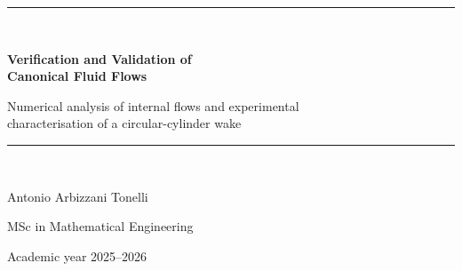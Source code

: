 \documentclass[11pt,a4paper]{article}
\begin{document}
\begin{titlepage}
  \centering
  \vspace*{22mm}
  {\color{reportblue}\rule{\linewidth}{1.4pt}}\\[9mm]
  {\LARGE\bfseries Verification and Validation of\\[2mm] Canonical Fluid Flows\par}
  \vspace{5mm}
  {\large Numerical analysis of internal flows and experimental\\
  characterisation of a circular-cylinder wake\par}
  \vspace{9mm}
  {\color{reportblue}\rule{\linewidth}{0.7pt}}\\[20mm]
  {\large Antonio Arbizzani Tonelli\par}
  \vspace{3mm}
  {\normalsize MSc in Mathematical Engineering\par}
  \vfill
  {\normalsize Academic year 2025--2026\par}
  \vspace{18mm}
\end{titlepage}

\begin{abstract}
This work presents a numerical and experimental investigation of two classes of canonical fluid-flow problems. The numerical part concerns laminar and turbulent flow in circular pipes. Mesh sensitivity, hydrodynamic development, the fully developed velocity profile, pressure losses, wall scaling, and turbulence-model performance are assessed from PHOENICS simulations. The experimental part concerns the wake and fluid forces generated by a circular cylinder in a free-surface channel. The measurement chain is first calibrated and checked for stability; particle-shadow velocimetry then resolves the mean wake and its dominant unsteadiness, while force measurements provide the mean drag and lift coefficients and an independent estimate of the shedding frequency.

The laminar calculation reproduces the Poiseuille profile with a relative $L_\infty$ error of $3.18\%$ and the analytical pressure gradient within $1.24\%$. At $Re_b=75{,}000$, the standard $k$--$\varepsilon$ model gives the closest friction factor to the experimental reference, with a relative discrepancy of $0.082\%$. For the low-Reynolds-number closure, the radial-grid profile differences are not monotonic and reach $3.15\%$ in the finest comparison; grid independence is therefore not claimed for this case. The load-cell calibration is linear over the investigated range ($R^2=0.999999$), with a force RMSE of $5.72$~mN. The cylinder measurements give $\overline{C_D}=1.499$ and a force-based Strouhal number $St=0.181$; the velocity-field analysis gives $St=0.204$ at a second operating condition. A spatial spectral check supports this PSV peak at most eligible grid points, subject to the frequency resolution of the record.
\end{abstract}
\end{document}
